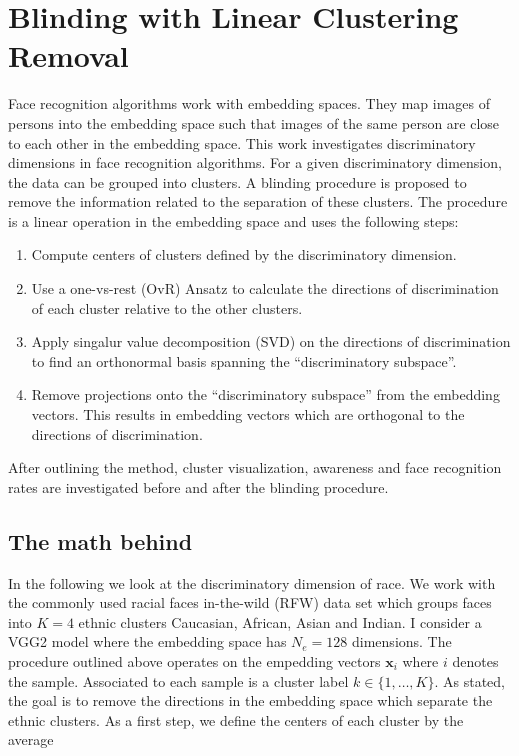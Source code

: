 \documentclass{report}
\begin{document}
\chapter{Blinding with Linear Clustering Removal}
\author{Samuel Wehrli}
\date{\today}

Face recognition algorithms work with embedding spaces. They map images of persons into the embedding space such that images of the same person are close to each other in the embedding space. This work investigates discriminatory dimensions in face recognition algorithms. For a given discriminatory dimension, the data can be grouped into clusters. A blinding procedure is proposed to remove the information related to the separation of these clusters. The procedure is a linear operation in the embedding space and uses the following steps:

\begin{enumerate}
	\item Compute centers of clusters defined by the discriminatory dimension.
	\item Use a one-vs-rest (OvR) Ansatz to calculate the directions of discrimination of each cluster relative to the other clusters.
	\item Apply singalur value decomposition (SVD) on the directions of discrimination to find an orthonormal basis spanning the ``discriminatory subspace''.
	\item Remove projections onto the ``discriminatory subspace'' from the embedding vectors. This results in embedding vectors which are orthogonal to the directions of discrimination.
\end{enumerate} 

\noindent After outlining the method,  cluster visualization, awareness and face recognition rates are investigated before and after the blinding procedure.

\section{The math behind}

In the following we look at the discriminatory dimension of race. We work with the commonly used racial faces in-the-wild (RFW) data set which groups faces into $K=4$ ethnic clusters Caucasian, African, Asian and Indian. I consider a VGG2 model where the embedding space has $N_e=128$ dimensions. The procedure outlined above operates on the empedding vectors $\bm{x}_i$ where $i$ denotes the sample. Associated to each sample is a cluster label $k\in\{1,\ldots, K\}$. As stated, the goal is to remove the directions in the embedding space which separate the ethnic clusters. As a first step, we define the centers of each cluster by the average
\end{document}
